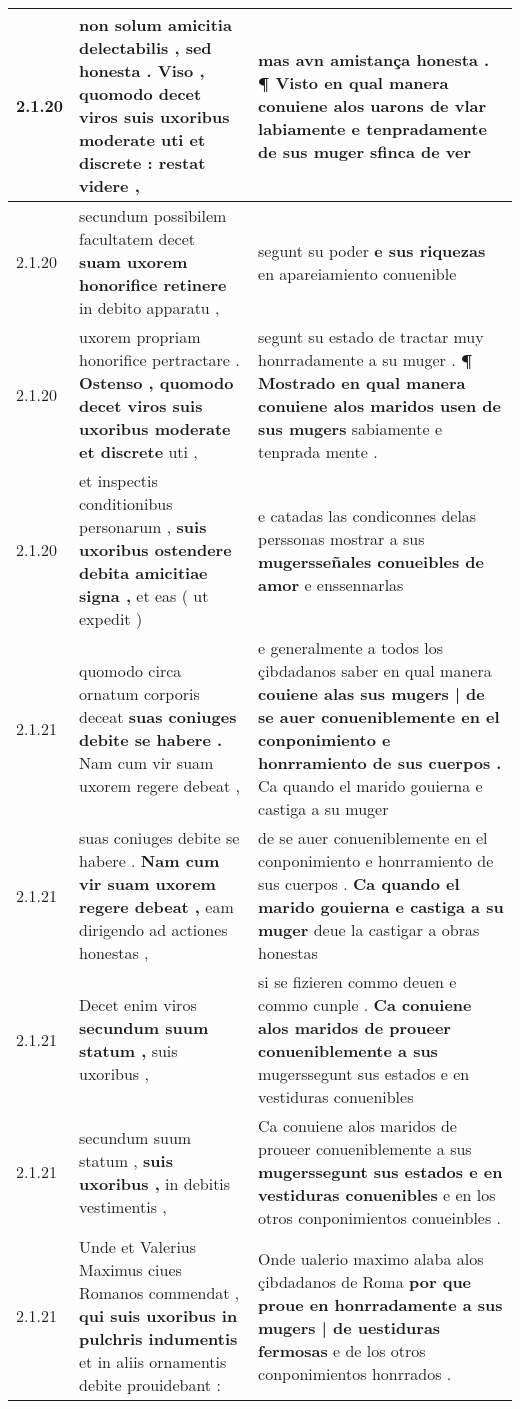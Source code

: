 \begin{tabular}{|p{1cm}|p{6.5cm}|p{6.5cm}|}
2.1.20 & non solum amicitia delectabilis , sed honesta . Viso , \textbf{ quomodo decet viros suis uxoribus moderate uti et discrete : } restat videre , & mas avn amistança honesta . \textbf{ ¶ Visto en qual manera conuiene alos uarons de vlar labiamente } e tenpradamente de sus muger sfinca de ver \\\hline
2.1.20 & secundum possibilem facultatem decet \textbf{ suam uxorem honorifice retinere } in debito apparatu , & segunt su poder \textbf{ e sus riquezas } en apareiamiento conuenible \\\hline
2.1.20 & uxorem propriam honorifice pertractare . \textbf{ Ostenso , quomodo decet viros suis uxoribus moderate et discrete } uti , & segunt su estado de tractar muy honrradamente a su muger . \textbf{ ¶ Mostrado en qual manera conuiene alos maridos usen de sus mugers } sabiamente e tenprada mente . \\\hline
2.1.20 & et inspectis conditionibus personarum , \textbf{ suis uxoribus ostendere debita amicitiae signa , } et eas ( ut expedit ) & e catadas las condiconnes delas perssonas mostrar a sus \textbf{ mugersseñales conueibles de amor } e enssennarlas \\\hline
2.1.21 & quomodo circa ornatum corporis deceat \textbf{ suas coniuges debite se habere . } Nam cum vir suam uxorem regere debeat , & e generalmente a todos los çibdadanos saber en qual manera \textbf{ couiene alas sus mugers | de se auer conueniblemente en el conponimiento e honrramiento de sus cuerpos . } Ca quando el marido gouierna e castiga a su muger \\\hline
2.1.21 & suas coniuges debite se habere . \textbf{ Nam cum vir suam uxorem regere debeat , } eam dirigendo ad actiones honestas , & de se auer conueniblemente en el conponimiento e honrramiento de sus cuerpos . \textbf{ Ca quando el marido gouierna e castiga a su muger } deue la castigar a obras honestas \\\hline
2.1.21 & Decet enim viros \textbf{ secundum suum statum , } suis uxoribus , & si se fizieren commo deuen e commo cunple . \textbf{ Ca conuiene alos maridos de proueer conueniblemente a sus } mugerssegunt sus estados e en vestiduras conuenibles \\\hline
2.1.21 & secundum suum statum , \textbf{ suis uxoribus , } in debitis vestimentis , & Ca conuiene alos maridos de proueer conueniblemente a sus \textbf{ mugerssegunt sus estados e en vestiduras conuenibles } e en los otros conponimientos conueinbles . \\\hline
2.1.21 & Unde et Valerius Maximus ciues Romanos commendat , \textbf{ qui suis uxoribus in pulchris indumentis } et in aliis ornamentis debite prouidebant : & Onde ualerio maximo alaba alos çibdadanos de Roma \textbf{ por que proue en honrradamente a sus mugers | de uestiduras fermosas } e de los otros conponimientos honrrados . \\\hline

\end{tabular}
